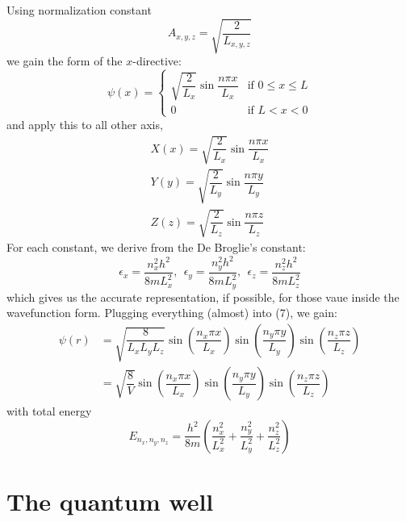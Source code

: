Using normalization constant
\begin{equation}
  A_{x,y,z} = \sqrt{\frac{2}{L_{x,y,z}}}
\end{equation}
we gain the form of the $x$-directive: 
\begin{equation*}
  \psi(x) = 
\begin{cases} 
\sqrt{\dfrac{2}{L_x}}\sin{\dfrac{n \pi x}{L_x}} & \mbox{if } 0 \leq x \leq L \\ 
0 & \mbox{if } {L < x < 0} 
\end{cases}
\end{equation*}
and apply this to all other axis, 
\begin{align}
  X(x) = \sqrt{\dfrac{2}{L_x}}\sin{\dfrac{n \pi x}{L_x}}\\
  Y(y) = \sqrt{\dfrac{2}{L_y}}\sin{\dfrac{n \pi y}{L_y}}\\
  Z(z) = \sqrt{\dfrac{2}{L_z}}\sin{\dfrac{n \pi z}{L_z}}
\end{align}
For each constant, we derive from the De Broglie's constant: 
\begin{equation*}
  \epsilon_{x} = \dfrac{n_{x}^{2}h^{2}}{8mL_x^{2}} , \: \: \epsilon_{y} = \dfrac{n_{y}^{2}h^{2}}{8mL_y^{2}} ,\:\: \epsilon_{z} = \dfrac{n_{z}^{2}h^{2}}{8mL_z^{2}}
\end{equation*}
which gives us the accurate representation, if possible, for those vaue inside the wavefunction form. Plugging everything (almost) into (7), we gain: 
\begin{equation}
  \begin{split}
    \psi(r) & = \sqrt{\dfrac{8}{L_x L_y L_z}}\sin \left( \dfrac{n_{x} \pi x}{L_x} \right) \sin \left(\dfrac{n_{y} \pi y}{L_y}\right) \sin \left(\dfrac{ n_{z} \pi z}{L_z} \right) \\
    & = \sqrt{\dfrac{8}{V}}\sin \left( \dfrac{n_{x} \pi x}{L_x} \right) \sin \left(\dfrac{n_{y} \pi y}{L_y}\right) \sin \left(\dfrac{ n_{z} \pi z}{L_z} \right) 
  \end{split}
\end{equation}
with total energy
\begin{equation}
  E_{n_x,n_y,n_z} = \dfrac{h^{2}}{8m}\left(\dfrac{n_{x}^{2}}{L_x^{2}} + \dfrac{n_{y}^{2}}{L_y^{2}} + \dfrac{n_{z}^{2}}{L_z^{2}}\right) 
\end{equation}

\clearpage
\section{The quantum well}

